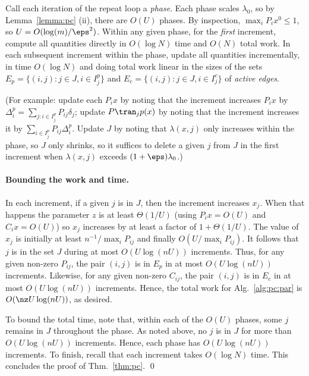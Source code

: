 Call each iteration of the repeat loop a {\em phase}.
Each phase scales $\lambda_0$, so by Lemma~\ref{lemma:pc} (ii), there are $O(U)$ phases.
By inspection, $\max_i P_i x^0 \le 1$, so $U=O(\log(m)/\eps^2)$.  
Within any given phase, 
for the \emph{first} increment,
compute all quantities directly
in $O(\log N)$ time and $O(N)$ total work.
In each subsequent increment within the phase,
update all quantities incrementally,
in time $O(\log N)$ and doing total work
linear in the sizes of the sets
$E_p = \{(i,j) : j \in J, i \in I^p_j\}$
and $E_c = \{(i,j) : j\in J, i \in I^c_j\}$
of \emph{active edges}.

(For example:
update each $P_i x$ by noting that the increment
increases $P_i x$ by $\Delta^p_i = \sum_{j: i\in I^p_j} P_{ij} \delta_j$;
update $P\tran_j p(x)$ by noting that the increment increases 
it by $\sum_{i \in I^p_j} P_{ij} \Delta^p_i$.
Update $J$ by noting that $\lambda(x,j)$ only increases within the phase,
so $J$ only shrinks, so it suffices to delete a given $j$ from $J$
in the first increment when $\lambda(x,j)$ exceeds $(1+\eps)\lambda_0$.)

\paragraph{Bounding the work and time.}
In each increment, if a given $j$ is in $J$, then the increment increases $x_j$.
When that happens the parameter $z$ is at least $\Theta(1/U)$
(using $P_i x = O(U)$ and $C_i x = O(U)$)
so $x_j$ increases by at least a factor of $1+\Theta(1/U)$.
The value of $x_j$ is initially at least $n^{-1}/\max_i P_{ij}$
and finally $O(U/\max_i P_{ij})$.
It follows that $j$ is in the set $J$ during at most $O(U\log(nU))$ increments.
Thus, for any given non-zero $P_{ij}$, the pair $(i,j)$ is in $E_p$
in at most $O(U\log(nU))$ increments.
Likewise, for any given non-zero $C_{ij}$, the pair $(i,j)$ is in $E_c$
in at most $O(U\log(nU))$ increments.
Hence, the total work for Alg.~\ref{alg:pc:par}
is $O(\nz U\log(n U))$, as desired.

To bound the total time, note that, within each of the $O(U)$ phases,
some $j$ remains in $J$ throughout the phase.
As noted above, no $j$ is in $J$ for more than $O(U\log(n U))$ increments.
Hence, each phase has $O(U\log(n U))$ increments.
To finish, recall that each increment takes $O(\log N)$ time.
This concludes the proof of Thm.~\ref{thm:pc}. \hfill \qed

